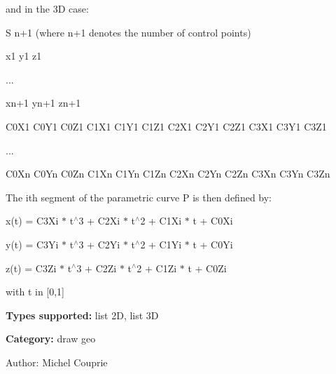and in the 3D case:

S n+1 (where n+1 denotes the number of control points)\par
 x1 y1 z1\par
 ...\par
 xn+1 yn+1 zn+1\par
 C0X1 C0Y1 C0Z1 C1X1 C1Y1 C1Z1 C2X1 C2Y1 C2Z1 C3X1 C3Y1 C3Z1\par
 ...\par
 C0Xn C0Yn C0Zn C1Xn C1Yn C1Zn C2Xn C2Yn C2Zn C3Xn C3Yn C3Zn\par


The ith segment of the parametric curve P is then defined by:

x(t) = C3Xi $\ast$ t$^\wedge$3 + C2Xi $\ast$ t$^\wedge$2 + C1Xi $\ast$ t + C0Xi\par
 y(t) = C3Yi $\ast$ t$^\wedge$3 + C2Yi $\ast$ t$^\wedge$2 + C1Yi $\ast$ t + C0Yi\par
 z(t) = C3Zi $\ast$ t$^\wedge$3 + C2Zi $\ast$ t$^\wedge$2 + C1Zi $\ast$ t + C0Zi\par
 with t in [0,1]

{\bf Types supported:} list 2D, list 3D

{\bf Category:} draw geo

\begin{Desc}
\item[Author:]Michel Couprie \end{Desc}
